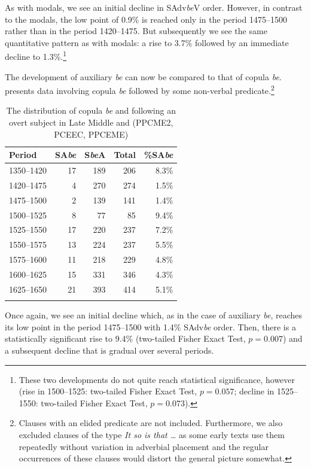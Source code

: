 \documentclass[output=paper]{langsci/langscibook}
\begin{document}
As with modals, we see an initial decline in SAdv\emph{be}V order. However,
in contrast to the modals, the low point of 0.9\% is reached only in the period
1475--1500 rather than in the period 1420--1475. But subsequently we see the same
quantitative pattern as with modals: a rise to 3.7\% followed by an immediate
decline to 1.3\%.\footnote{These two developments do not quite reach
statistical significance, however (rise in 1500--1525: two-tailed Fisher Exact
Test, $p = 0.057$; decline in 1525--1550: two-tailed Fisher Exact Test, $p =
0.073$).}

The development of auxiliary \emph{be} can now be compared to that of copula
\emph{be}.  presents data involving copula \emph{be}
followed by some non-verbal {predicate}.\footnote{Clauses with an elided
    predicate are not included. Furthermore, we also excluded clauses of the
type \emph{It so is that …} as some early texts use them repeatedly without
variation in adverbial placement and the regular occurrences of these clauses
would distort the general picture somewhat.}

\begin{table}[htbp]
\caption{The distribution of copula \emph{be} and  following an overt
subject in Late Middle and  (PPCME2, PCEEC,
PPCEME)\label{tab:key:09.3}}
\begin{tabular}{lrrrr}
\lsptoprule
{Period} & {SA\emph{be}} & {S\emph{be}A} & {Total} & {\%SA\emph{be}}\\
\midrule
1350--1420 & 17 & 189 & 206 & 8.3\%\\
1420--1475 & 4 & 270 & 274 & 1.5\%\\
1475--1500 & 2 & 139 & 141 & 1.4\%\\
1500--1525 & 8 & 77 & 85 & 9.4\%\\
1525--1550 & 17 & 220 & 237 & 7.2\%\\
1550--1575 & 13 & 224 & 237 & 5.5\%\\
1575--1600 & 11 & 218 & 229 & 4.8\%\\
1600--1625 & 15 & 331 & 346 & 4.3\%\\
1625--1650 & 21 & 393 & 414 & 5.1\%\\
\lspbottomrule
\end{tabular}
\end{table}

Once again, we see an initial decline which, as in the case of auxiliary
\emph{be}, reaches its low point in the period 1475--1500 with 1.4\%
SAdv\emph{be} order. Then, there is a statistically significant rise to 9.4\%
(two-tailed Fisher Exact Test, $p = 0.007$) and a subsequent decline that is
gradual over several periods.
\end{document}
